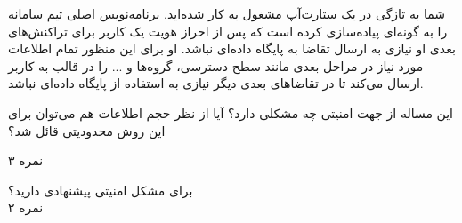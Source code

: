 \documentclass[../main.tex]{subfiles}
\begin{document}

شما به تازگی در یک ستارت‌آپ مشغول به کار شده‌اید.
برنامه‌نویس اصلی تیم سامانه را به گونه‌ای پیاده‌سازی کرده است که پس از احراز هویت یک کاربر
برای تراکنش‌های بعدی او نیازی به ارسال تقاضا به پایگاه داده‌ای نباشد.
او برای این منظور تمام اطلاعات مورد نیاز در مراحل بعدی مانند سطح دسترسی، گروه‌ها و ... را در قالب 
به کاربر ارسال می‌کند تا در تقاضاهای بعدی دیگر نیازی به استفاده از پایگاه داده‌ای نباشد.

این مساله از جهت امنیتی چه مشکلی دارد؟
آیا از نظر حجم اطلاعات هم می‌توان برای این روش محدودیتی قائل شد؟

۳ نمره


برای مشکل امنیتی پیشنهادی دارید؟
\\
۲ نمره

\end{document}
